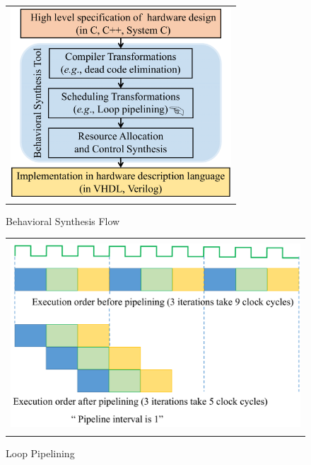 \begin{figure}[t!]
\begin{center}
\begin{tabular}{c}
\includegraphics[height=2.8in]{fig-proposal/behavioral-synthesis-intro}
\end{tabular}

\end{center}
\caption{Behavioral Synthesis Flow}
\label{fig:behavioral-synthesis-flow}
\end{figure}

\begin{figure}[t!]
\begin{center}
\begin{tabular}{c}
\includegraphics[height=2.8in]{fig-proposal/simple-pipeline}
\end{tabular}
\end{center}
\caption{Loop Pipelining}
\label{fig:simple-pipeline}
\end{figure}

